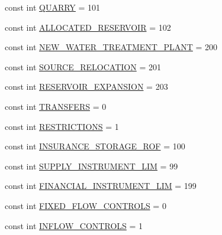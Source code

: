 \begin{DoxyCompactItemize}
\item 
const int \mbox{\hyperlink{namespaceConstants_ac5f85f1f073e01d6d42ac8b19fc73f1e_ac5f85f1f073e01d6d42ac8b19fc73f1e}{Q\+U\+A\+R\+RY}} = 101
\item 
const int \mbox{\hyperlink{namespaceConstants_a2769e2f1bc080457c78297402e78c8d1_a2769e2f1bc080457c78297402e78c8d1}{A\+L\+L\+O\+C\+A\+T\+E\+D\+\_\+\+R\+E\+S\+E\+R\+V\+O\+IR}} = 102
\item 
const int \mbox{\hyperlink{namespaceConstants_a6166f1b56ea9e9bfd63ac77cb99da31a_a6166f1b56ea9e9bfd63ac77cb99da31a}{N\+E\+W\+\_\+\+W\+A\+T\+E\+R\+\_\+\+T\+R\+E\+A\+T\+M\+E\+N\+T\+\_\+\+P\+L\+A\+NT}} = 200
\item 
const int \mbox{\hyperlink{namespaceConstants_ab321801ef588e5083ec368d310871523_ab321801ef588e5083ec368d310871523}{S\+O\+U\+R\+C\+E\+\_\+\+R\+E\+L\+O\+C\+A\+T\+I\+ON}} = 201
\item 
const int \mbox{\hyperlink{namespaceConstants_a27567a2a62ed837986156cb424fdc83f_a27567a2a62ed837986156cb424fdc83f}{R\+E\+S\+E\+R\+V\+O\+I\+R\+\_\+\+E\+X\+P\+A\+N\+S\+I\+ON}} = 203
\item 
const int \mbox{\hyperlink{namespaceConstants_a02748ff742cda86e055625ce8ca43133_a02748ff742cda86e055625ce8ca43133}{T\+R\+A\+N\+S\+F\+E\+RS}} = 0
\item 
const int \mbox{\hyperlink{namespaceConstants_a15c13d76b55f85fae5635ec62063c0d9_a15c13d76b55f85fae5635ec62063c0d9}{R\+E\+S\+T\+R\+I\+C\+T\+I\+O\+NS}} = 1
\item 
const int \mbox{\hyperlink{namespaceConstants_a459317d221226a86ebf5b00a4f87eaa7_a459317d221226a86ebf5b00a4f87eaa7}{I\+N\+S\+U\+R\+A\+N\+C\+E\+\_\+\+S\+T\+O\+R\+A\+G\+E\+\_\+\+R\+OF}} = 100
\item 
const int \mbox{\hyperlink{namespaceConstants_a0dbf27e9d760dfcdbde4c841e74bbf78_a0dbf27e9d760dfcdbde4c841e74bbf78}{S\+U\+P\+P\+L\+Y\+\_\+\+I\+N\+S\+T\+R\+U\+M\+E\+N\+T\+\_\+\+L\+IM}} = 99
\item 
const int \mbox{\hyperlink{namespaceConstants_a4f863f4b075dd82d9c79710fa7437734_a4f863f4b075dd82d9c79710fa7437734}{F\+I\+N\+A\+N\+C\+I\+A\+L\+\_\+\+I\+N\+S\+T\+R\+U\+M\+E\+N\+T\+\_\+\+L\+IM}} = 199
\item 
const int \mbox{\hyperlink{namespaceConstants_ad8ac2a802acc9bbd547c676255692ff3_ad8ac2a802acc9bbd547c676255692ff3}{F\+I\+X\+E\+D\+\_\+\+F\+L\+O\+W\+\_\+\+C\+O\+N\+T\+R\+O\+LS}} = 0
\item 
const int \mbox{\hyperlink{namespaceConstants_af73061aaa392892f65f5070d7a979895_af73061aaa392892f65f5070d7a979895}{I\+N\+F\+L\+O\+W\+\_\+\+C\+O\+N\+T\+R\+O\+LS}} = 1

\end{DoxyCompactItemize}
